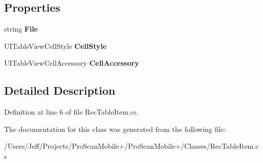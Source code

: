 \subsection*{Properties}
\begin{DoxyCompactItemize}
\item 
\hypertarget{class_pro_scan_mobile_1_1_rec_table_item_a986fbc59f5cd9776d3ad721a6319bdf9}{string {\bfseries File}}\label{class_pro_scan_mobile_1_1_rec_table_item_a986fbc59f5cd9776d3ad721a6319bdf9}

\item 
\hypertarget{class_pro_scan_mobile_1_1_rec_table_item_a09050c401c18bc892188a256fda21591}{U\-I\-Table\-View\-Cell\-Style {\bfseries Cell\-Style}}\label{class_pro_scan_mobile_1_1_rec_table_item_a09050c401c18bc892188a256fda21591}

\item 
\hypertarget{class_pro_scan_mobile_1_1_rec_table_item_a908bcc04b2442097c0f56535fe259702}{U\-I\-Table\-View\-Cell\-Accessory {\bfseries Cell\-Accessory}}\label{class_pro_scan_mobile_1_1_rec_table_item_a908bcc04b2442097c0f56535fe259702}

\end{DoxyCompactItemize}


\subsection{Detailed Description}


Definition at line 6 of file Rec\-Table\-Item.\-cs.



The documentation for this class was generated from the following file\-:\begin{DoxyCompactItemize}
\item 
/\-Users/\-Jeff/\-Projects/\-Pro\-Scan\-Mobile+/\-Pro\-Scan\-Mobile+/\-Classes/Rec\-Table\-Item.\-cs\end{DoxyCompactItemize}
